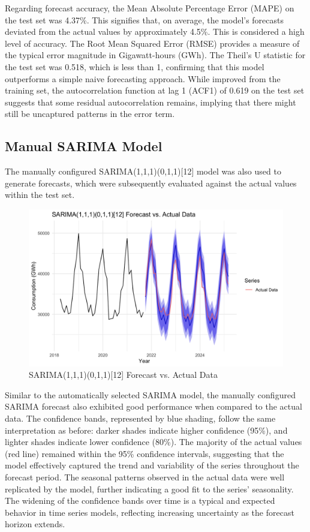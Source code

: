 Regarding forecast accuracy, the Mean Absolute Percentage Error (MAPE) on the test set was 4.37\%. This signifies that, on average, the model's forecasts deviated from the actual values by approximately 4.5\%. This is considered a high level of accuracy. The Root Mean Squared Error (RMSE) provides a measure of the typical error magnitude in Gigawatt-hours (GWh). The Theil's U statistic for the test set was 0.518, which is less than 1, confirming that this model outperforms a simple naive forecasting approach. While improved from the training set, the autocorrelation function at lag 1 (ACF1) of 0.619 on the test set suggests that some residual autocorrelation remains, implying that there might still be uncaptured patterns in the error term.\\

\subsection{Manual SARIMA Model}

The manually configured SARIMA(1,1,1)(0,1,1)[12] model was also used to generate forecasts, which were subsequently evaluated against the actual values within the test set.\\

\begin{figure}[H]
    \centering
    \includegraphics[width=1\linewidth]{images/for_ma.png}
    \caption{SARIMA(1,1,1)(0,1,1)[12] Forecast vs. Actual Data}
    \label{fig:enter-label}
\end{figure}

Similar to the automatically selected SARIMA model, the manually configured SARIMA forecast also exhibited good performance when compared to the actual data. The confidence bands, represented by blue shading, follow the same interpretation as before: darker shades indicate higher confidence (95\%), and lighter shades indicate lower confidence (80\%). The majority of the actual values (red line) remained within the 95\% confidence intervals, suggesting that the model effectively captured the trend and variability of the series throughout the forecast period. The seasonal patterns observed in the actual data were well replicated by the model, further indicating a good fit to the series' seasonality. The widening of the confidence bands over time is a typical and expected behavior in time series models, reflecting increasing uncertainty as the forecast horizon extends.\\

